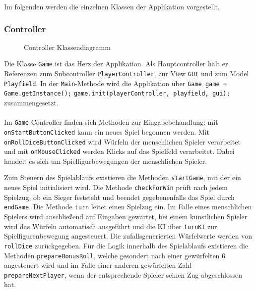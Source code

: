 \documentclass[conference]{IEEEtran}
\begin{document}
  Im folgenden werden die einzelnen Klassen der Applikation vorgestellt.\\

\subsubsection{Controller}
\begin{figure}[]
    \centering
    \caption{Controller Klassendiagramm}
\end{figure}

Die Klasse \texttt{Game} ist das Herz der Applikation. Als Hauptcontroller h\"alt er Referenzen zum Subcontroller \texttt{PlayerController}, zur View \texttt{GUI} und zum Model \texttt{Playfield}. In der \texttt{Main}-Methode wird die Applikation \"uber\newline
\texttt{Game game = Game.getInstance();}\newline
\texttt{game.init(playerController, playfield, gui);}\newline
zusammengesetzt. \\\\
Im \texttt{Game}-Controller finden sich Methoden zur Eingabebehandlung: mit \texttt{onStartButtonClicked} kann ein neues Spiel begonnen werden. Mit \texttt{onRollDiceButtonClicked} wird W\"urfeln der menschlichen Spieler verarbeitet und mit \texttt{onMouseClicked} werden Klicks auf das Spielfeld verarbeitet. Dabei handelt es sich um Spielfigurbewegungen der menschlichen Spieler.

Zum Steuern des Spielablaufs existieren die Methoden \texttt{startGame}, mit der ein neues Spiel initialisiert wird.
Die Methode \texttt{checkForWin} pr\"uft nach jedem Spielzug, ob ein Sieger feststeht und beendet gegebenenfalls das Spiel durch
\texttt{endGame}.
Die Methode \texttt{turn} leitet einen Spielzug ein. Im Falle eines menschlichen Spielers wird anschlie\ss end auf Eingaben gewartet, bei einem k\"unstlichen Spieler wird das W\"urfeln automatisch ausgef\"uhrt und die KI \"uber \texttt{turnKI} zur Spielfigurenbewegung angesteuert. Die zufallsgenerierten W\"urfelwerte
werden von \texttt{rollDice} zur\"uckgegeben. F\"ur die Logik innerhalb des Spielablaufs existieren die Methoden
\texttt{prepareBonusRoll}, welche gesondert nach einer gew\"urfelten 6 angesteuert wird und im Falle einer anderen gew\"urfelten Zahl
\texttt{prepareNextPlayer}, wenn der entsprechende Spieler seinen Zug abgeschlossen hat.\\
\end{document}
